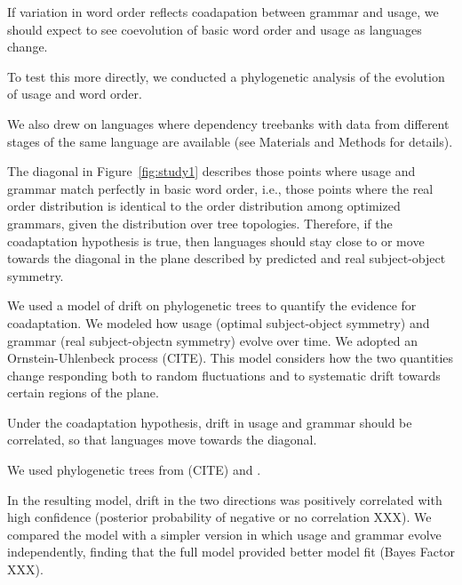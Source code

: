 \documentclass[11pt,a4paper]{article}
\begin{document}
If variation in word order reflects coadapation between grammar and usage, we should expect to see coevolution of basic word order and usage as languages change.

To test this more directly, we conducted a phylogenetic analysis of the evolution of usage and word order.

We also drew on languages where dependency treebanks with data from different stages of the same language are available (see Materials and Methods for details).



The diagonal in Figure~\ref{fig:study1} describes those points where usage and grammar match perfectly in basic word order, i.e., those points where the real order distribution is identical to the order distribution among optimized grammars, given the distribution over tree topologies.
Therefore, if the coadaptation hypothesis is true, then languages should stay close to or move towards the diagonal in the plane described by predicted and real subject-object symmetry.



We used a model of drift on phylogenetic trees to quantify the evidence for coadaptation.
We modeled how usage (optimal subject-object symmetry) and grammar (real subject-objectn symmetry) evolve over time.
We adopted an Ornstein-Uhlenbeck process (CITE).
This model considers how the two quantities change responding both to random fluctuations and to systematic drift towards certain regions of the plane.

Under the coadaptation hypothesis, drift in usage and grammar should be correlated, so that languages move towards the diagonal.


We used phylogenetic trees from (CITE) and .


In the resulting model, drift in the two directions was positively correlated with high confidence (posterior probability of negative or no correlation XXX).
We compared the model with a simpler version in which usage and grammar evolve independently, finding that the full model provided better model fit (Bayes Factor XXX).
\end{document}
